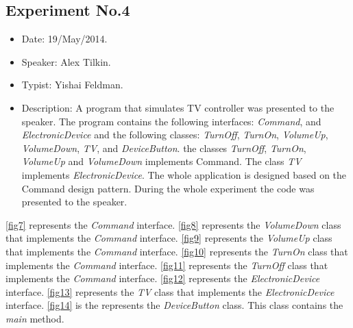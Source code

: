 \subsection{Experiment No.4}
\begin{itemize}
	\item Date: 19/May/2014.
	\item Speaker: Alex Tilkin.
	\item Typist: Yishai Feldman.
	\item Description: A program that simulates TV controller was presented to the speaker. The program contains the following interfaces: \textit{Command}, and \textit{ElectronicDevice} and the following classes: \textit{TurnOff}, \textit{TurnOn}, \textit{VolumeUp}, \textit{VolumeDown}, \textit{TV}, and \textit{DeviceButton}. the classes \textit{TurnOff}, \textit{TurnOn}, \textit{VolumeUp} and \textit{VolumeDown} implements Command. The class \textit{TV} implements \textit{ElectronicDevice}. The whole application is designed based on the Command design pattern. During the whole experiment the code was presented to the speaker.
\end{itemize}
\autoref{fig7} represents the \textit{Command} interface. \autoref{fig8} represents the \textit{VolumeDown} class that implements the \textit{Command} interface. \autoref{fig9} represents the \textit{VolumeUp} class that implements the \textit{Command} interface. \autoref{fig10} represents the \textit{TurnOn} class that implements the \textit{Command} interface. \autoref{fig11} represents the \textit{TurnOff} class that implements the \textit{Command} interface. \autoref{fig12} represents the \textit{ElectronicDevice} interface. \autoref{fig13} represents the \textit{TV} class that implements the \textit{ElectronicDevice} interface. \autoref{fig14} is the represents the \textit{DeviceButton} class. This class contains the \textit{main} method.

